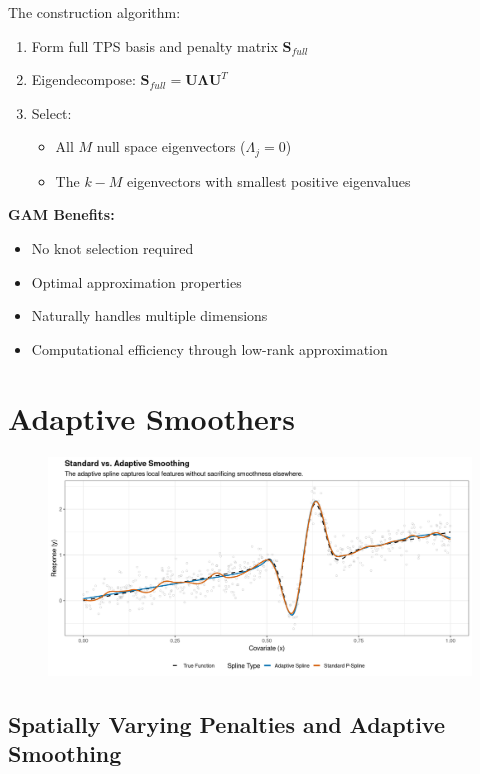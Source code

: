 \documentclass[12pt]{article}
\begin{document}
The construction algorithm:
\begin{enumerate}
    \item Form full TPS basis and penalty matrix $\mathbf{S}_{full}$
    \item Eigendecompose: $\mathbf{S}_{full} = \mathbf{U}\bm{\Lambda}\mathbf{U}^T$
    \item Select:
    \begin{itemize}
        \item All $M$ null space eigenvectors ($\Lambda_j = 0$)
        \item The $k-M$ eigenvectors with smallest positive eigenvalues
    \end{itemize}
\end{enumerate}

\textbf{GAM Benefits:}
\begin{itemize}
    \item No knot selection required
    \item Optimal approximation properties
    \item Naturally handles multiple dimensions
    \item Computational efficiency through low-rank approximation
\end{itemize}

\section{Adaptive Smoothers}
\begin{figure}
    \centering
    \includegraphics[width=\linewidth]{overviews//GAM-theory/adaptive_spline.png}
\end{figure}

\subsection{Spatially Varying Penalties and Adaptive Smoothing}
\end{document}
